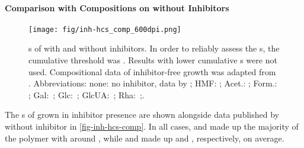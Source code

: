 \paragraph{Comparison with Compositions on \GLC{} without Inhibitors}
\begin{figure}
	\begin{center}
		\texttt{[image: fig/inh-hcs\_comp\_600dpi.png]}
		\caption[\AMC{}s of  With and Without Inhibitors]{\Amc{}s of  with and without inhibitors. In order to reliably assess the \amc{}s, the cumulative \amc{} threshold was . Results with lower cumulative \amc{}s were not used. Compositional data of inhibitor-free growth was adapted from \textcite{Ruehmann2015b}. Abbreviations: none: no inhibitor, data by \textcite{Ruehmann2015b}; HMF: \hmf{}; Acet.: \acet{}; Form.: \fora{}; Gal:~\gal{}; Glc:~\glc{}; GlcUA:~\glcua{}; Rha:~\rha{};.\label{fig-inh-hcs-comp}}
	\end{center}
\end{figure}
The \amc{}s of  grown in inhibitor presence are shown alongside data published by \textcite{Ruehmann2015b} without inhibitor in \vref{fig-inh-hcs-comp}. In all cases, \glc{} and \rha{} made up the majority of the polymer with around , while \glcua{} and \gal{} made up  and , respectively, on average.

